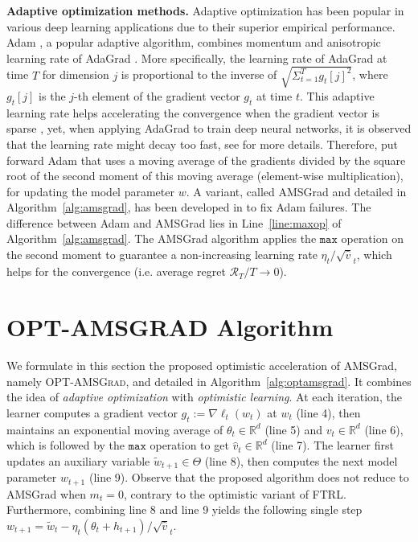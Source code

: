 \documentclass[wcp]{jmlr}
\begin{document}
\textbf{Adaptive optimization methods.}\hspace{0.1cm}
Adaptive optimization has been popular in various deep learning applications due to their superior empirical performance.
Adam \citep{KB15}, a popular adaptive algorithm, combines momentum \citep{P64} and anisotropic learning rate of AdaGrad \citep{DHS11}.
More specifically, the learning rate of AdaGrad at time $T$ for dimension $j$ is proportional to the inverse of $\sqrt{ \Sigma_{t=1}^T g_t[j]^2 }$, where $g_t[j]$ is the $j$-th element of the gradient vector $g_t$ at time $t$.
This adaptive learning rate helps accelerating the convergence when the gradient vector is sparse \citep{DHS11}, yet, when applying AdaGrad to train deep neural networks, it is observed that the learning rate might decay too fast, see \citep{KB15} for more details.
Therefore, \cite{KB15} put forward Adam that uses a moving average of the gradients divided by the square root of the second moment of this moving average (element-wise multiplication), for updating the model parameter $w$.
A variant, called AMSGrad and detailed in Algorithm~\ref{alg:amsgrad}, has been developed in \citep{RKK18} to fix Adam failures.
The difference between Adam and AMSGrad lies in Line~\ref{line:maxop} of Algorithm~\ref{alg:amsgrad}.
The AMSGrad algorithm \citep{RKK18} applies the $\texttt{max}$ operation on the second moment to guarantee a non-increasing learning rate $\eta_t / \sqrt{\hat{v}}_t $, which helps for the convergence (i.e. average regret $\mathcal{R}_T/T \rightarrow 0$).


\section{\textsc{OPT-AMSGRAD} Algorithm}\label{sec:opt}
\vspace{-0.05in}





We formulate in this section the proposed optimistic acceleration of AMSGrad, namely \textsc{OPT-AMSGrad}, and detailed in Algorithm~\ref{alg:optamsgrad}.  
It combines the idea of \emph{adaptive optimization} with \emph{optimistic learning}. 
At each iteration, the learner computes a gradient vector $g_{t}:= \nabla \ell_t( w_t)$ at $w_{t}$ (line 4), then maintains an exponential moving average of $\theta_{t} \in \mathbb R^{d}$ (line 5) and $v_{t} \in \mathbb R^{d}$ (line 6), which is followed by the $\texttt{max}$ operation to get $\hat{v}_{t} \in \mathbb R^{d}$ (line 7). 
The learner first updates an auxiliary variable $\tilde{w}_{t+1} \in \Theta$ (line 8), then computes the next model parameter $w_{t+1}$ (line 9).
Observe that the proposed algorithm does not reduce to AMSGrad when $m_{t}=0$, contrary to the optimistic variant of FTRL.
Furthermore, combining line 8 and line 9 yields the following single step $w_{t+1}= \tilde{w}_{t}  - \eta_t (\theta_t + h_{t+1} )/ \sqrt{\hat{v}}_t $. 
\end{document}
